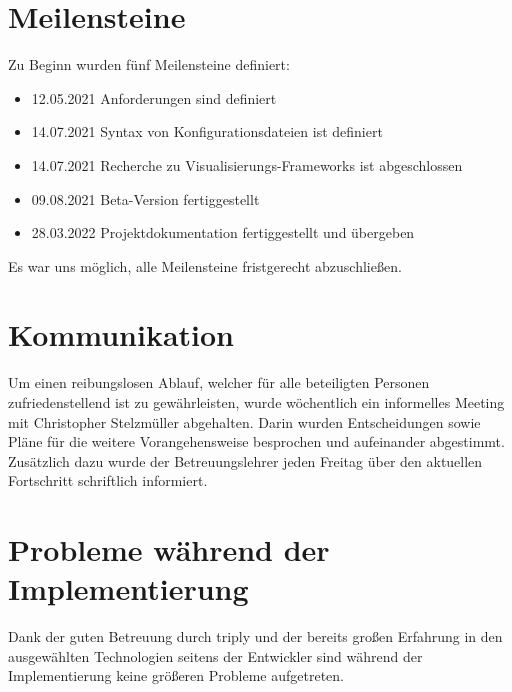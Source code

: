 \section{Meilensteine}
Zu Beginn wurden fünf Meilensteine definiert:

\begin{itemize}
    \item 12.05.2021 Anforderungen sind definiert
    \item 14.07.2021 Syntax von Konfigurationsdateien ist definiert
    \item 14.07.2021 Recherche zu Visualisierungs-Frameworks ist abgeschlossen
    \item 09.08.2021 Beta-Version fertiggestellt
    \item 28.03.2022 Projektdokumentation fertiggestellt und übergeben
\end{itemize}

Es war uns möglich, alle Meilensteine fristgerecht abzuschließen.

\section{Kommunikation}
Um einen reibungslosen Ablauf, welcher für alle beteiligten Personen zufriedenstellend ist zu gewährleisten, wurde wöchentlich
ein informelles Meeting mit Christopher Stelzmüller abgehalten.
Darin wurden Entscheidungen sowie Pläne für die weitere Vorangehensweise besprochen und aufeinander abgestimmt.
Zusätzlich dazu wurde der Betreuungslehrer jeden Freitag über den aktuellen Fortschritt schriftlich informiert.

\section{Probleme während der Implementierung}
Dank der guten Betreuung durch triply und der bereits großen Erfahrung in den ausgewählten Technologien seitens der
Entwickler sind während der Implementierung keine größeren Probleme aufgetreten.